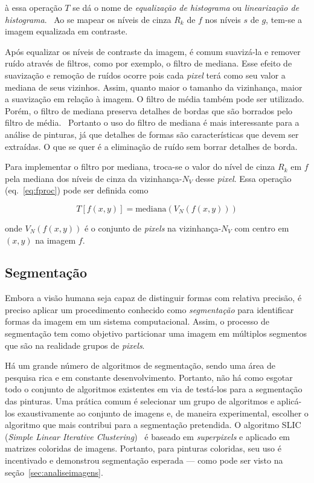 \noindent à essa operação $T$ se dá o nome de \emph{equalização de
  histograma} ou \emph{linearização de histograma}.~\cite{gonzalez} Ao
se mapear os níveis de cinza $R_k$ de $f$ nos níveis $s$ de $g$,
tem-se a imagem equalizada em contraste.

Após equalizar os níveis de contraste da imagem, é comum suavizá-la e
remover ruído através de filtros, como por exemplo, o filtro de
mediana. Esse efeito de suavização e remoção de ruídos ocorre pois
cada \textit{pixel} terá como seu valor a mediana de seus
vizinhos. Assim, quanto maior o tamanho da vizinhança, maior a
suavização em relação à imagem. O filtro de média também pode ser
utilizado. Porém, o filtro de mediana preserva detalhes de bordas que
são borrados pelo filtro de média.~\cite{gonzalez} Portanto o uso do
filtro de mediana é mais interessante para a análise de pinturas, já
que detalhes de formas são características que devem ser extraídas. O
que se quer é a eliminação de ruído sem borrar detalhes de borda.

Para implementar o filtro por mediana, troca-se o valor do nível de
cinza $R_k$ em $f$ pela mediana dos níveis de cinza da
vizinhança-$N_V$ desse \textit{pixel}. Essa operação
(eq.~\ref{eq:fproc}) pode ser definida como

\begin{equation}
  T[f(x,y)] = \text{mediana}(V_N(f(x,y)))
\end{equation}

\noindent onde $V_N(f(x,y))$ é o conjunto de \textit{pixels} na
vizinhança-$N_V$ com centro em $(x,y)$ na imagem $f$.

\subsection{Segmentação}
\label{sec:slic}

Embora a visão humana seja capaz de distinguir formas com relativa
precisão, é preciso aplicar um procedimento conhecido
como \emph{segmentação} para identificar formas da imagem em um
sistema computacional. Assim, o processo de segmentação tem como
objetivo particionar uma imagem em múltiplos segmentos que são na
realidade grupos de \textit{pixels}.

Há um grande número de algoritmos de segmentação, sendo uma área de
pesquisa rica e em constante desenvolvimento. Portanto, não há como
esgotar todo o conjunto de algoritmos existentes em via de testá-los
para a segmentação das pinturas. Uma prática comum é selecionar um
grupo de algoritmos e aplicá-los exaustivamente ao conjunto de imagens
e, de maneira experimental, escolher o algoritmo que mais contribui
para a segmentação pretendida. O algoritmo SLIC (\textit{Simple Linear
Iterative Clustering})~\cite{slic} é baseado em
\textit{superpixels} e aplicado em matrizes coloridas de imagens. Portanto,
para pinturas coloridas, seu uso é incentivado e demonstrou
segmentação esperada --- como pode ser visto na
seção~\ref{sec:analiseimagens}.

